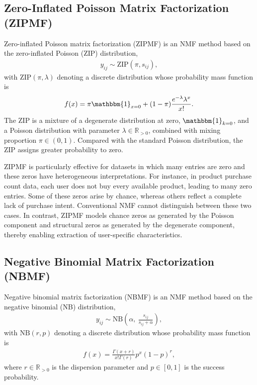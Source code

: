 \documentclass[pdflatex,sn-basic]{sn-jnl}%
\theoremstyle{thmstyleone}%
\theoremstyle{thmstyletwo}%
\theoremstyle{thmstylethree}%
\begin{document}
\subsection{Zero-Inflated Poisson Matrix Factorization (ZIPMF)}
Zero-inflated Poisson matrix factorization (ZIPMF) \citep{simchowitz2013zero} is an NMF method based on the zero-inflated Poisson (ZIP) distribution,
\begin{align}
	y_{ij} \sim \mathrm{ZIP}(\pi, s_{ij}),
\end{align}
with $\mathrm{ZIP}(\pi,\lambda)$ denoting a discrete distribution whose probability mass function is
\begin{align}
	f(x) = \pi \mathbbm{1}_{x = 0} + (1-\pi)\frac{e^{-\lambda}\lambda^{x}}{x!}.
\end{align}
The ZIP is a mixture of a degenerate distribution at zero, $\mathbbm{1}_{k=0}$, and a Poisson distribution with parameter $\lambda \in \mathbb{R}_{>0}$, combined with mixing proportion $\pi \in (0,1)$.  
Compared with the standard Poisson distribution, the ZIP assigns greater probability to zero.

ZIPMF is particularly effective for datasets in which many entries are zero and these zeros have heterogeneous interpretations.  
For instance, in product purchase count data, each user does not buy every available product, leading to many zero entries.  
Some of these zeros arise by chance, whereas others reflect a complete lack of purchase intent.  
Conventional NMF cannot distinguish between these two cases.  
In contrast, ZIPMF models chance zeros as generated by the Poisson component and structural zeros as generated by the degenerate component, thereby enabling extraction of user-specific characteristics.


\subsection{Negative Binomial Matrix Factorization (NBMF)}\label{Sec: Negative Binomial Matrix Factorization}
Negative binomial matrix factorization (NBMF) \citep{Gouvert2020} is an NMF method based on the negative binomial (NB) distribution,
\begin{align}
	y_{ij} \sim \mathrm{NB}\left(\alpha,\  \frac{s_{ij}}{s_{ij} + \alpha} \right), \label{eq: NBMF}
\end{align}
with $\mathrm{NB}(r,p)$ denoting a discrete distribution whose probability mass function is
\begin{align}
	f(x) = \frac{\Gamma(x+r)}{x!\Gamma(r)}p^{x}(1-p)^{r},
\end{align}
where $r \in \mathbb{R}_{>0}$ is the dispersion parameter and $p \in [0,1]$ is the success probability.  
\end{document}
